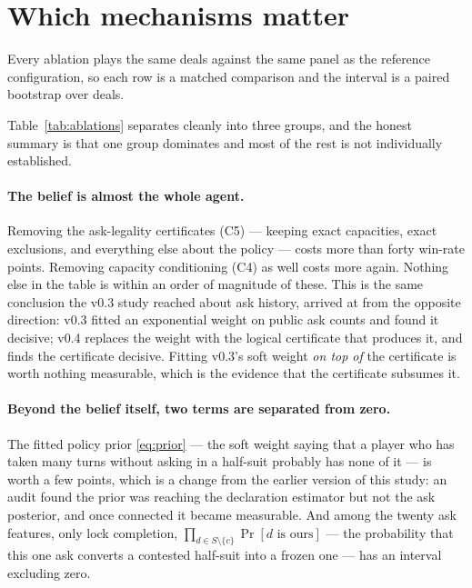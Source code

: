 \section{Which mechanisms matter}
\label{sec:ablations}

Every ablation plays the same deals against the same panel as the reference
configuration, so each row is a matched comparison and the interval is a paired
bootstrap over deals.

\begin{table}[ht]
\centering
\caption{Paired ablations. Positive ``full $-$ ablated'' means the complete
FishBot v0.4 won more often than the modified policy on identical deals.}
\label{tab:ablations}
\small

\end{table}

Table~\ref{tab:ablations} separates cleanly into three groups, and the honest summary is that
one group dominates and most of the rest is not individually established.

\paragraph{The belief is almost the whole agent.} Removing the ask-legality
certificates (C5) --- keeping exact capacities, exact exclusions, and everything
else about the policy --- costs more than forty win-rate points. Removing
capacity conditioning (C4) as well costs more again. Nothing else in the table is
within an order of magnitude of these. This is the same conclusion the v0.3 study
reached about ask history, arrived at from the opposite direction: v0.3 fitted an
exponential weight on public ask counts and found it decisive; v0.4 replaces the
weight with the logical certificate that produces it, and finds the certificate
decisive. Fitting v0.3's soft weight \emph{on top of} the certificate is worth
nothing measurable, which is the evidence that the certificate subsumes it.

\paragraph{Beyond the belief itself, two terms are separated from zero.} The
fitted policy prior \eqref{eq:prior} --- the soft weight saying that a player who
has taken many turns without asking in a half-suit probably has none of it --- is
worth a few points, which is a change from the earlier version of this study: an
audit found the prior was reaching the declaration estimator but not the ask
posterior, and once connected it became measurable. And among the twenty ask
features, only lock completion, $\prod_{d \in S \setminus \{c\}} \Pr[d \text{ is
ours}]$ --- the probability that this one ask converts a contested half-suit into
a frozen one --- has an interval excluding zero.


